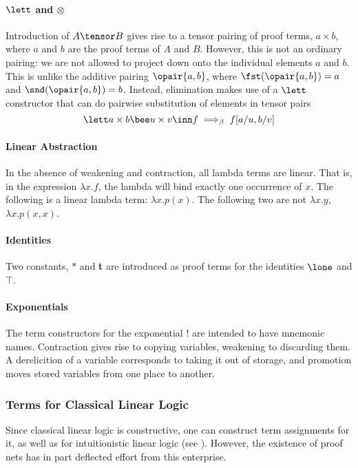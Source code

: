 \paragraph{$\lett$ and $\otimes$}  Introduction of $A\tensor B$ gives
rise to a tensor pairing of proof terms,  $a\times b$, where $a$ and $b$ are
the proof terms of $A$ and $B$.  However, this is not an ordinary 
pairing:  we are not allowed to project down onto the individual
elements $a$ and $b$.  This is unlike the additive pairing
$\opair{a,b}$, where $\fst(\opair{a,b}) = a$ and $\snd(\opair{a,b}) =
b$.  Instead, elimination makes use of a $\lett$ constructor that can
do pairwise substitution of elements in tensor pairs
\[\lett a\times b \bee u\times v \inn f \; \Longrightarrow_{\beta} \;
f[a/u,b/v]\]

\paragraph{Linear Abstraction}
In the absence of weakening and contraction, all lambda terms are
linear.  That is, in the expression $\lambda x.f$, the lambda will
bind exactly one occurrence of $x$.  The following is a linear
lambda term: $\lambda x.p(x)$.  The following two are not $\lambda
x.y$, $\lambda x.p(x,x)$.

\paragraph{Identities}  Two constants, $*$ and {\bf t} are introduced
as proof terms for the identities $\lone$ and $\top$.  

\paragraph{Exponentials} The term constructors for the exponential !
are intended to have mnemonic names.  Contraction gives rise to
copying variables, weakening to discarding them.  A derelicition
of a variable corresponds to taking it out of storage, and promotion
moves stored variables from one place to another.



\subsubsection{Terms for Classical Linear Logic}

Since classical linear logic is constructive, one can construct
term assignments for it, as well as for intuitionistic linear logic
(see ).  However, the existence of proof nets
has in part deflected effort from this enterprise.

